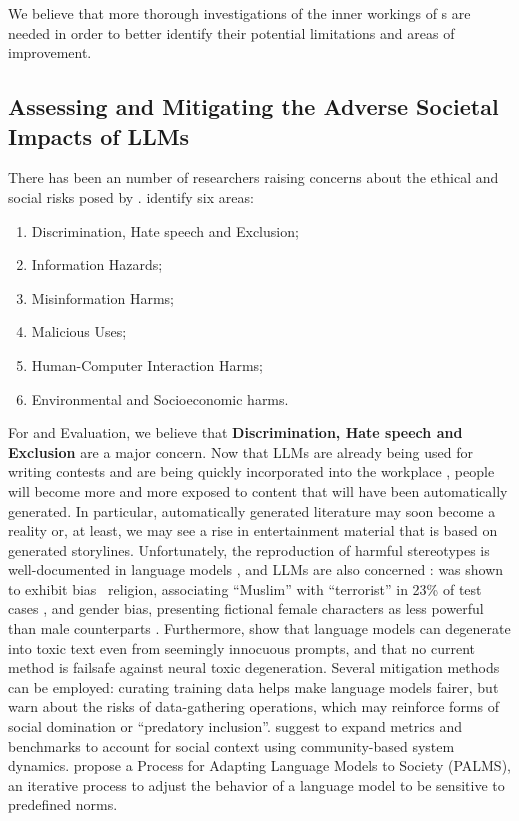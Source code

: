 We believe that more thorough investigations of the inner workings of {\llmfull}s are needed in order to better identify their potential limitations and areas of improvement.

\subsection{Assessing and Mitigating the Adverse Societal Impacts of LLMs}

There has been an number of researchers raising concerns about the ethical and social risks posed by {\llm}. \citet{weidinger2022taxonomy} identify six areas:

\begin{enumerate}[noitemsep]
    \item Discrimination, Hate
speech and Exclusion;
    \item Information Hazards;
    \item Misinformation
Harms;
    \item Malicious Uses;
    \item Human-Computer Interaction Harms;
    \item Environmental and Socioeconomic harms.
\end{enumerate}

For {\asgfull} and Evaluation, we believe that \textbf{Discrimination, Hate speech and Exclusion} are a major concern. Now that LLMs are already being used for writing contests \citep{edilivre2023concours} and are being quickly incorporated into the workplace \citep{humlum2024adoption}, people will become more and more exposed to content that will have been automatically generated. In particular, automatically generated literature may soon become a reality or, at least, we may see a rise in entertainment material that is based on generated storylines. Unfortunately, the reproduction of harmful stereotypes is well-documented in language models \citep{caliskan2017semantics}, and LLMs are also concerned \citep{bubeck2023sparks}: {\gptthree} was shown to exhibit bias {\wrt}\ religion, associating ``Muslim'' with ``terrorist'' in 23\% of test cases \citep{abid2021persistent}, and gender bias, presenting fictional female characters as less powerful than male counterparts \citep{lucy-bamman-2021-gender}. Furthermore, \citet{gehman-etal-2020-realtoxicityprompts} show that language models can degenerate into toxic text even from seemingly innocuous prompts, and that no current method is failsafe against neural toxic degeneration. Several mitigation methods can be employed: curating training data helps make language models fairer, but \citet{denton2020bringing} warn about the risks of data-gathering operations, which may reinforce forms of social domination or ``predatory inclusion''. \citet{martin2020participatory} suggest to expand metrics and benchmarks to account for social context using community-based system dynamics. \citet{solaiman2021process} propose a Process for Adapting Language Models to Society (PALMS), an iterative process to adjust the behavior of a language model to be sensitive to predefined norms.

